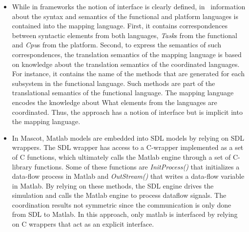 \begin{itemize}
		\item While in frameworks the notion of interface is clearly defined, in~\cite{dinatale} information about the syntax and semantics of the functional and platform languages is contained into the mapping language. First, it contains correspondences between syntactic elements from both languages, \eg \emph{Task}s from the functional and \emph{Cpu}s from the platform. Second, to express the semantics of such correspondences, the translation semantics of the mapping language is based on knowledge about the translation semantics of the coordinated languages. For instance, it contains the name of the methods that are generated for each subsystem in the functional language. Such methods are part of the translational semantics of the functional language. The mapping language encodes the knowledge about What elements from the languages are coordinated. Thus, the approach has a notion of interface but is implicit into the mapping language. 
		
		\item In Mascot, Matlab models are embedded into SDL models by relying on SDL wrappers. The SDL wrapper has access to a C-wrapper implemented as a set of C functions, which ultimately calls the Matlab engine through a set of C-library functions. Some of these functions are \emph{InitProcess()} that initializes a data-flow process in Matlab and \emph{OutStream()} that writes a data-flow variable in Matlab. By relying on these methods, the SDL engine drives the simulation and calls the Matlab engine to process dataflow signals. The coordination results not symmetric since the communication is only done from SDL to Matlab. In this approach, only matlab is interfaced by relying on C wrappers that act as an explicit interface.
		
		
		\end{itemize}
